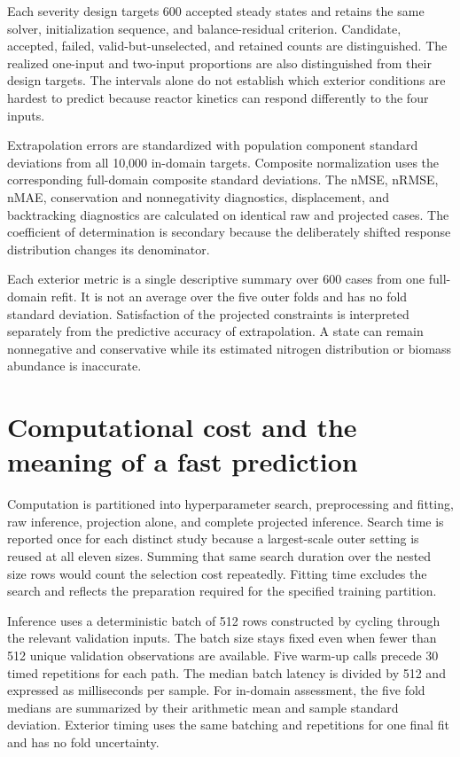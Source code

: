 Each severity design targets 600 accepted steady states and retains the same solver, initialization sequence, and balance-residual criterion. Candidate, accepted, failed, valid-but-unselected, and retained counts are distinguished. The realized one-input and two-input proportions are also distinguished from their design targets. The intervals alone do not establish which exterior conditions are hardest to predict because reactor kinetics can respond differently to the four inputs.

Extrapolation errors are standardized with population component standard deviations from all 10,000 in-domain targets. Composite normalization uses the corresponding full-domain composite standard deviations. The nMSE, nRMSE, nMAE, conservation and nonnegativity diagnostics, displacement, and backtracking diagnostics are calculated on identical raw and projected cases. The coefficient of determination is secondary because the deliberately shifted response distribution changes its denominator.

Each exterior metric is a single descriptive summary over 600 cases from one full-domain refit. It is not an average over the five outer folds and has no fold standard deviation. Satisfaction of the projected constraints is interpreted separately from the predictive accuracy of extrapolation. A state can remain nonnegative and conservative while its estimated nitrogen distribution or biomass abundance is inaccurate.

\section{Computational cost and the meaning of a fast prediction}

Computation is partitioned into hyperparameter search, preprocessing and fitting, raw inference, projection alone, and complete projected inference. Search time is reported once for each distinct study because a largest-scale outer setting is reused at all eleven sizes. Summing that same search duration over the nested size rows would count the selection cost repeatedly. Fitting time excludes the search and reflects the preparation required for the specified training partition.

Inference uses a deterministic batch of 512 rows constructed by cycling through the relevant validation inputs. The batch size stays fixed even when fewer than 512 unique validation observations are available. Five warm-up calls precede 30 timed repetitions for each path. The median batch latency is divided by 512 and expressed as milliseconds per sample. For in-domain assessment, the five fold medians are summarized by their arithmetic mean and sample standard deviation. Exterior timing uses the same batching and repetitions for one final fit and has no fold uncertainty.

